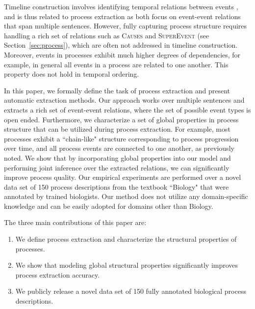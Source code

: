 Timeline construction involves identifying temporal relations between events \cite{Chambers08,Yoshikawa09,Denis11,Do12,Mcclosky12}, and is thus related to process extraction as both focus on event-event relations that span multiple sentences. However, fully capturing process structure requires handling a rich set of relations such as \textsc{Causes} and \textsc{SuperEvent} (see Section~\ref{sec:process}), which are often not addressed in timeline construction. Moreover, events in processes exhibit much higher degrees of dependencies, for example, in general all events in a process are related to one another. This property does not hold in temporal ordering. 

In this paper, we formally define the task of process extraction and present automatic extraction methods. 
Our approach works over multiple sentences and extracts a rich set of event-event relations, where the set of possible event types is open ended. 
Furthermore, we characterize a set of global properties in process structure that can be utilized during process extraction. 
For example, most processes exhibit a ``chain-like" structure corresponding to process progression over time, and all process events are connected to one another, as previously noted. 
We show that by incorporating global properties into our model and performing joint inference over the extracted relations, we can significantly improve process quality.  
Our empirical experiments are performed over a novel data set of 150 process descriptions from the textbook ``Biology" \cite{CampbellReece} that were annotated by trained biologists. Our method does not utilize any domain-specific knowledge and can be easily adopted for domains other than Biology.

The three main contributions of this paper are:
\begin{enumerate}[itemsep=0pt,topsep=0pt] 
\item We define process extraction and characterize the structural properties of processes.
\item We show that modeling global structural properties significantly improves process extraction accuracy.
\item  We publicly release a novel data set of 150 fully annotated biological process descriptions.
\end{enumerate}
